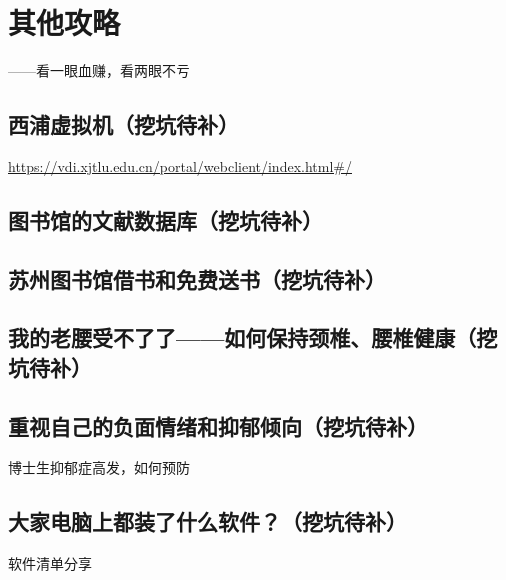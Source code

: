 
\chapter{其他攻略}

\begin{flushright}
    ——看一眼血赚，看两眼不亏
\end{flushright}





\section{西浦虚拟机（挖坑待补）}
\url{https://vdi.xjtlu.edu.cn/portal/webclient/index.html#/}
\section{图书馆的文献数据库（挖坑待补）}
\section{苏州图书馆借书和免费送书（挖坑待补）}
\section{我的老腰受不了了——如何保持颈椎、腰椎健康（挖坑待补）}
\section{重视自己的负面情绪和抑郁倾向（挖坑待补）}
博士生抑郁症高发，如何预防
\section{大家电脑上都装了什么软件？（挖坑待补）}
软件清单分享

